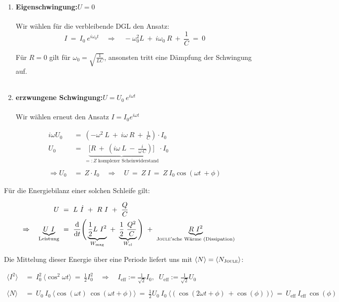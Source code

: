 \newpage
\begin{enumerate}
\item \textbf{ Eigenschwingung:}\qquad $U=0$\\
\ \\
Wir wählen für die verbleibende DGL den Ansatz:
\begin{equation*}
I \ = \ I_0 \ e^{i\omega_0 t} \quad\Rightarrow\quad -\omega_0^2 L \ + \ i\omega_0 \ R \ + \ \frac{1}{C} \ = \ 0
\end{equation*}

Für $R=0$ gilt für $\omega_0=\sqrt{\frac{1}{LC}}$, ansonsten tritt eine Dämpfung der Schwingung auf.
\ \\\

\item \textbf{ erzwungene Schwingung:}\qquad $U=U_0 \ e^{i\omega t}$\\
\ \\
Wir wählen erneut den Ansatz $I=I_0 e^{i\omega t}$

\begin{align*}
i\omega U_0  \ &= \ \left(-\omega^2 \ L \ + \ i \omega \ R \ + \ \frac{1}{C}\right) \cdot I_0\\
U_0 \ &= \ \underbrace{\Bigg[R \ + \ \left(i\omega \ L \ - \ \frac{i}{\omega \ C}\right)\Bigg]}_{=: Z \text{ komplexer Scheinwiderstand}} \cdot I_0\\
\ \\
\Rightarrow U_0 \ &= \ Z \cdot I_0 \quad\Rightarrow\quad U  \ = \ Z \ I  \ = \  Z \ I_0 \cos (\omega t \ + \phi)
\end{align*}
\end{enumerate}

Für die Energiebilanz einer solchen Schleife gilt:

\begin{align*}
U  \ &= \ L \ \dot{I} \ + \ R \ I \ + \ \frac{Q}{C}\\
\Rightarrow\quad \underbrace{U \ I}_{\text{Leistung}} \ &= \ \diff{}{t} \Bigg( \underbrace{\frac{1}{2}L \ I^2}_{W_{\text{mag}}} \ + \ \underbrace{\frac{1}{2} \ \frac{Q^2}{C}}_{W_{\text{el}}}\Bigg) \ + \ \underbrace{R \ I^2}_{\text{\textsc{Joule}'sche Wärme (Dissipation)}} 
\end{align*}

Die Mittelung dieser Energie über eine Periode liefert uns mit $\langle N \rangle = \langle N_{\textsc{Joule}} \rangle$:

\begin{align*}
\langle I^2 \rangle \ &= \ I_0^2 \ \langle\cos^2\omega t \rangle  \ = \  \frac{1}{2}I_0^2 \quad \Rightarrow\quad I_{\text{eff}} := \frac{1}{\sqrt{2}}I_0, \; \; U_{\text{eff}}:= \frac{1}{\sqrt{2}}U_0\\
\ \\
\langle N \rangle  \ &= \ U_0 \ I_0 \ \Big\langle\cos (\omega t) \ \cos(\omega t + \phi) \Big\rangle  \ = \  \frac{1}{2}U_0 \ I_0 \ \Big\langle\left(\cos(2\omega t + \phi) \ + \cos (\phi)\right)\Big\rangle  \ = \ U_{\text{eff}} \ I_{\text{eff}} \ \cos(\phi)
\end{align*}

